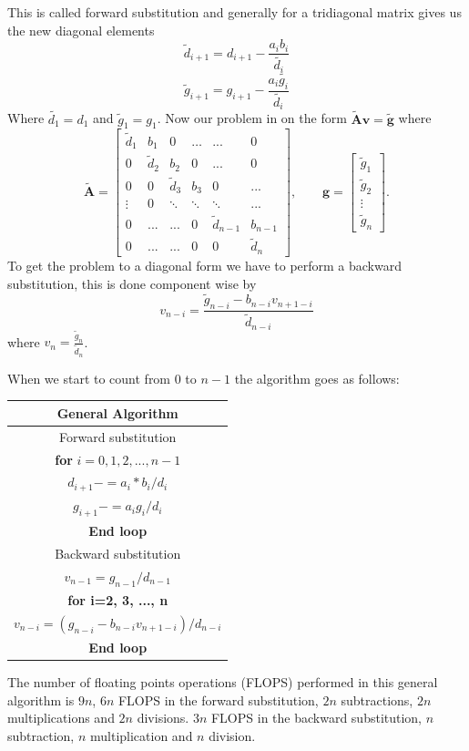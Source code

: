 \documentclass[10pt]{article}
\begin{document}
This is called forward substitution and generally for a tridiagonal matrix gives us the new diagonal elements 
$$\tilde{d}_{i+1}=d_{i+1}-\frac{a_ib_i}{\tilde{d_i}}$$  $$\tilde{g}_{i+1}=g_{i+1}-\frac{a_i\tilde{g_i}}{\tilde{d_i}}$$ Where $\tilde{d_1}=d_1$ and $\tilde{g}_1=g_1$. Now our problem in on the form $\mathbf{\tilde{A}}\mathbf{v}=\mathbf{\tilde{g}}$ where $$
\mathbf{\tilde{A}}=  \begin{bmatrix}
 \tilde{d}_1 & b_1 & 0 & \dots & ... & 0 \\
 0 &\tilde{d}_2 & b_2 & 0 & ... & 0 \\
 0  & 0 & \tilde{d}_3 & b_3 & 0 & ... \\
 \vdots & 0 & \ddots & \ddots & \ddots & ...\\
 0 & ... & ... & 0 & \tilde{d}_{n-1} & b_{n-1}\\
 0 & ... & ... & 0 & 0 & \tilde{d}_{n} 
\end{bmatrix}, \qquad \mathbf{g}=\begin{bmatrix}
 \tilde{g}_1 \\ \tilde{g}_2 \\ \vdots \\ \tilde{g}_n
\end{bmatrix}.
$$
To get the problem to a diagonal form we have to perform a backward substitution, this is done component wise by 
$$v_{n-i}=\frac{\tilde{g}_{n-i}-b_{n-i}v_{n+1-i}}{\tilde{d}_{n-i}}$$ where $v_{n}=\frac{\tilde{g}_n}{\tilde{d}_n}$. 

When we start to count from 0 to $n-1$ the algorithm goes as follows:

\begin{center}
  \begin{tabular}{||c||}
    \hline\hline
    \textbf{General Algorithm}\\
    \hline\hline
    Forward substitution \\
    \textbf{for} $i=0,1,2,...,n-1$\\
      $d_{i+1}-=a_i*b_i/d_i$ \\
      $g_{i+1}-=a_ig_i/d_i$ \\
      \textbf{End loop} \\
      Backward substitution \\
      $v_{n-1}=g_{n-1}/d_{n-1}$\\
      \textbf{for i=2, 3, ..., n} \\
      $v_{n-i}=(g_{n-i}-b_{n-i}v_{n+1-i})/d_{n-i}$\\ 
      \textbf{End loop}\\
      \hline\hline
  \end{tabular}
\end{center}
The number of floating points operations (FLOPS) performed in this general algorithm is $9n$, $6n$ FLOPS in the forward substitution, $2n$ subtractions, $2n$ multiplications and $2n$ divisions. $3n$ FLOPS in the backward substitution, $n$ subtraction, $n$ multiplication and $n$ division.
\end{document}
